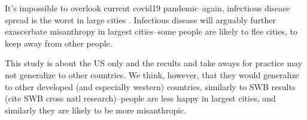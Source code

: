 \documentclass[10pt, letterpaper]{article}
\begin{document}
\begin{spacing}{1.4}
It's impossible to overlook current covid19 pandemic--again, infectious disease
spread is the worst in large cities \cite{bettencourt10}. %
 Infectious disease will arguably further exascerbate misanthropy in largest
 cities--some people are likely to flee cities, to keep away from other people.



This study is about the US only and the recults and take aways for practice may
not generalize to other countries. We think, however, that they would generalize
to other developed (and especially western) countries, similarly to SWB results
(cite SWB cross natl research)--people are less happy in largest cities, and
similarly they are likely to be more misanthropic.


\end{spacing}
\end{document}
